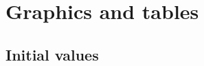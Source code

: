 
\appendixtoc
{}
\label{app:appendix}


%  
%
%

\centering

\chapter{Graphics and tables}

\section{Initial values}
\label{app:initials}

